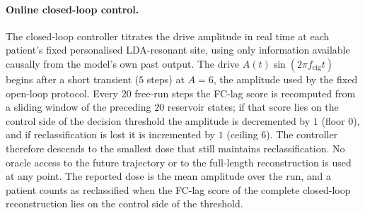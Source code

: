 \documentclass[11pt]{article}
\begin{document}
\paragraph{Online closed-loop control.}
The closed-loop controller titrates the drive amplitude in real time at each
patient's fixed personalised LDA-resonant site, using only information available
causally from the model's own past output. The drive
$A(t)\sin(2\pi f_{\mathrm{eig}}t)$ begins after a short transient ($5$ steps) at
$A=6$, the amplitude used by the fixed open-loop protocol. Every $20$ free-run
steps the FC-lag score is recomputed from a sliding window of the preceding $20$
reservoir states; if that score lies on the control side of the decision
threshold the amplitude is decremented by $1$ (floor $0$), and if reclassification
is lost it is incremented by $1$ (ceiling $6$). The controller therefore descends
to the smallest dose that still maintains reclassification. No oracle access to
the future trajectory or to the full-length reconstruction is used at any point.
The reported dose is the mean amplitude over the run, and a patient counts as
reclassified when the FC-lag score of the complete closed-loop reconstruction
lies on the control side of the threshold.
\end{document}
